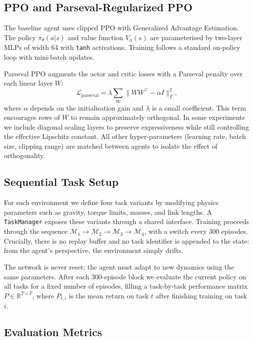 \documentclass[conference]{IEEEtran}
\begin{document}
\subsection{PPO and Parseval-Regularized PPO}

The baseline agent uses clipped PPO with Generalized Advantage Estimation. The policy $\pi_\theta(a|s)$ and value function $V_\phi(s)$ are parameterised by two-layer MLPs of width 64 with \texttt{tanh} activations. Training follows a standard on-policy loop with mini-batch updates.

Parseval PPO augments the actor and critic losses with a Parseval penalty over each linear layer $W$:
\begin{equation}
    \mathcal{L}_{\text{parseval}}
    = \lambda \sum_W \big\| W W^\top - \alpha I \big\|_F^2,
\end{equation}
where $\alpha$ depends on the initialisation gain and $\lambda$ is a small coefficient. This term encourages rows of $W$ to remain approximately orthogonal. In some experiments we include diagonal scaling layers to preserve expressiveness while still controlling the effective Lipschitz constant. All other hyper-parameters (learning rate, batch size, clipping range) are matched between agents to isolate the effect of orthogonality.

\subsection{Sequential Task Setup}

For each environment we define four task variants by modifying physics parameters such as gravity, torque limits, masses, and link lengths. A \texttt{TaskManager} exposes these variants through a shared interface. Training proceeds through the sequence
\(
\mathcal{M}_1 \to \mathcal{M}_2 \to \mathcal{M}_3 \to \mathcal{M}_4
\),
with a switch every 300 episodes. Crucially, there is no replay buffer and no task identifier is appended to the state: from the agent's perspective, the environment simply drifts.

The network is never reset; the agent must adapt to new dynamics using the same parameters. After each 300-episode block we evaluate the current policy on all tasks for a fixed number of episodes, filling a task-by-task performance matrix $P \in \mathbb{R}^{T \times T}$, where $P_{t,i}$ is the mean return on task $t$ after finishing training on task $i$.

\subsection{Evaluation Metrics}
\end{document}
